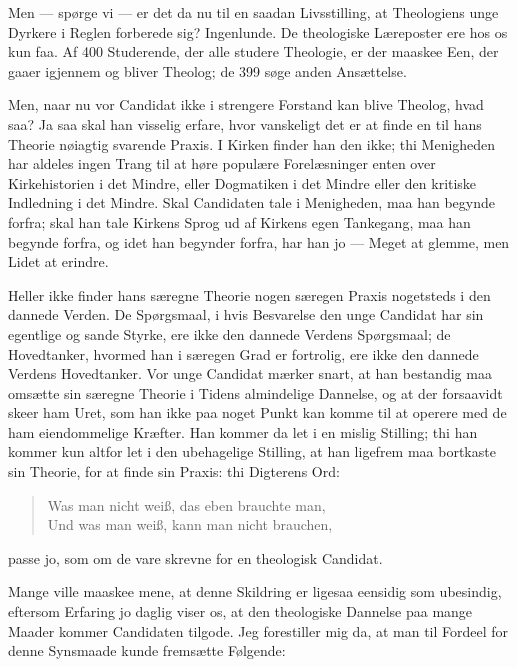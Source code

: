 \documentclass[12pt,a4paper]{book}
\newcommand{\opage}[1]{\marginnote{\footnotesize\textit{[#1]}}}
\begin{document}
Men --- spørge vi --- er det da nu til en saadan Livsstilling, at
Theologiens unge Dyrkere i Reglen forberede sig? Ingenlunde. De theologiske
Læreposter ere hos os kun faa. Af 400 Studerende, der alle studere
Theologie, er der maaskee Een, der gaaer igjennem og bliver Theolog; de 399
søge anden Ansættelse.

Men, naar nu vor Candidat ikke i strengere Forstand kan blive Theolog, hvad
saa? Ja saa skal han visselig erfare, hvor vanskeligt det er at finde en
til hans Theorie nøiagtig svarende Praxis. I Kirken finder han den ikke;
thi Menigheden har aldeles ingen Trang til at høre populære Forelæsninger
enten over Kirkehistorien i det Mindre, eller Dogmatiken i det Mindre eller
den kritiske Indledning i det Mindre. Skal Candidaten tale i Menigheden,
maa han begynde forfra; skal han tale Kirkens Sprog ud af Kirkens egen
Tankegang, maa han begynde forfra, og idet han begynder forfra, har han jo
--- Meget at glemme, men Lidet at erindre.

Heller ikke finder hans særegne Theorie nogen særegen Praxis nogetsteds i
den dannede Verden. De Spørgsmaal, i hvis Besvarelse den unge Candidat har
sin egentlige og sande Styrke, ere ikke den dannede Verdens Spørgsmaal; de
Hovedtanker, hvormed han i særegen Grad er fortrolig, ere ikke den dannede
Verdens Hovedtanker. Vor unge Candidat mærker snart, at han bestandig maa
omsætte sin særegne Theorie i Tidens almindelige Dannelse,
og at der forsaavidt skeer ham Uret, som han ikke paa noget Punkt kan komme
til at operere med de ham eiendommelige Kræfter. Han kommer da let i en
mislig Stilling; thi han kommer kun altfor let i den ubehagelige Stilling,
at han
\opage{139} ligefrem maa bortkaste sin Theorie, for at finde sin Praxis: thi Digterens
Ord:

\begin{quote}
Was man nicht weiß, das eben brauchte man,\\
Und was man weiß, kann man nicht brauchen,
\end{quote}

passe jo, som om de vare skrevne for en theologisk Candidat.

Mange ville maaskee mene, at denne Skildring er ligesaa eensidig som
ubesindig, eftersom Erfaring jo daglig viser os, at den theologiske
Dannelse paa mange Maader kommer Candidaten tilgode. Jeg forestiller mig
da, at man til Fordeel for denne Synsmaade kunde fremsætte Følgende:
\end{document}
